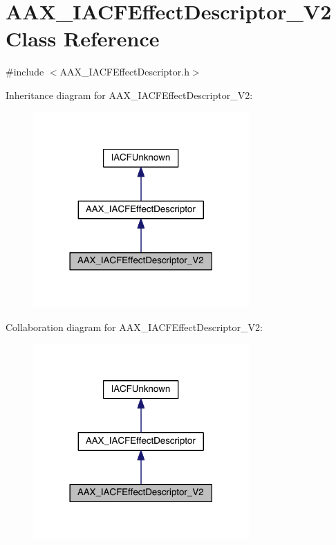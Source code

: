 \hypertarget{a00058}{}\section{A\+A\+X\+\_\+\+I\+A\+C\+F\+Effect\+Descriptor\+\_\+\+V2 Class Reference}
\label{a00058}


{\ttfamily \#include $<$A\+A\+X\+\_\+\+I\+A\+C\+F\+Effect\+Descriptor.\+h$>$}



Inheritance diagram for A\+A\+X\+\_\+\+I\+A\+C\+F\+Effect\+Descriptor\+\_\+\+V2\+:
\nopagebreak
\begin{figure}[H]
\begin{center}
\leavevmode
\includegraphics[width=234pt]{a00517}
\end{center}
\end{figure}


Collaboration diagram for A\+A\+X\+\_\+\+I\+A\+C\+F\+Effect\+Descriptor\+\_\+\+V2\+:
\nopagebreak
\begin{figure}[H]
\begin{center}
\leavevmode
\includegraphics[width=234pt]{a00518}
\end{center}
\end{figure}


